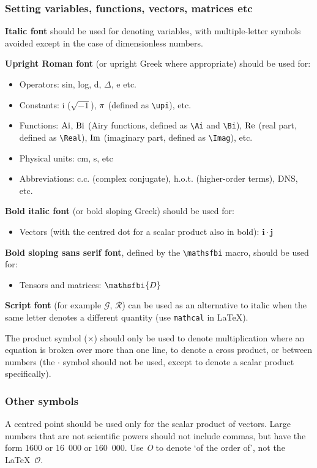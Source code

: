 \documentclass[12pt]{RBM_P}
\begin{document}
\subsubsection{Setting variables, functions, vectors, matrices etc}

\textbf{Italic font} should be used for denoting variables, with multiple-letter symbols avoided except in the case of dimensionless numbers.

\textbf{Upright Roman font} (or upright Greek where appropriate) should be used for:
\begin{itemize}
\item Operators: sin, log, d, $\Delta$, e etc.
\item Constants: i ($\sqrt{-1}$), $\pi$ (defined as \verb}\upi}), etc.
\item Functions: $\mbox{Ai}$, $\mbox{Bi}$ (Airy functions, defined as \verb|\Ai| and \verb|\Bi|), $\mbox{Re}$ (real part, defined as \verb|\Real|), $\mbox{Im}$ (imaginary part, defined as \verb|\Imag|), etc.
\item Physical units: cm, s, etc
\item Abbreviations: c.c. (complex conjugate), h.o.t. (higher-order terms), DNS, etc.
\end{itemize}

\textbf{Bold italic font} (or bold sloping Greek) should be used for:

\begin{itemize}
\item  Vectors (with the centred dot for a scalar product also in bold): $\boldsymbol{i \cdot j}$
\end{itemize}

\textbf{Bold sloping sans serif font}, defined by the \verb|\mathsfbi| macro, should be used for:
\begin{itemize}
\item Tensors and matrices: $\mathsfbi{D}$
\end{itemize}

\textbf{Script font} (for example $\mathcal{G}$, $\mathcal{R}$) can be used as an alternative to italic when the same letter denotes a different quantity (use \verb|mathcal| in \LaTeX).

The product symbol ($\times$) should only be used to denote multiplication where an equation is broken over more than one line, to denote a cross product, or between numbers (the $\cdot$ symbol should not be used, except to denote a scalar product specifically).


\subsubsection{Other symbols}
A centred point should be used only for the scalar product of vectors.
Large numbers that are not scientific powers should not include commas, but have the
form 1600 or 16~000 or 160~000.
Use \textit{O} to denote `of the order of', not the \LaTeX\ $\mathcal{O}$.
\end{document}

